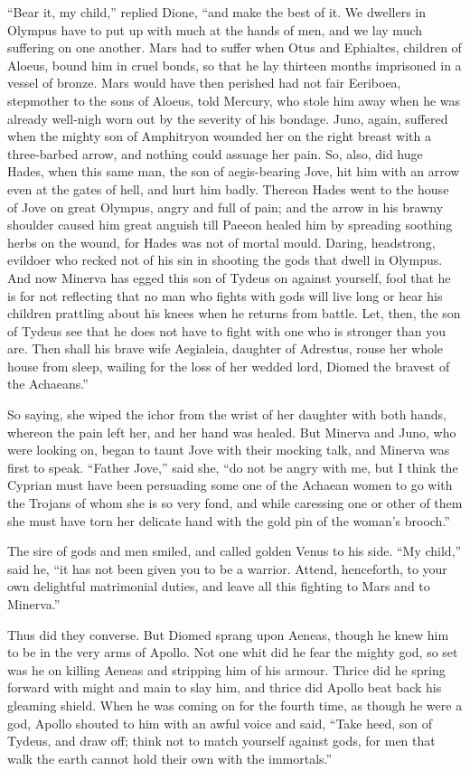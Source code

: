 “Bear it, my child,” replied Dione, “and make the best of it. We dwellers
in Olympus have to put up with much at the hands of men, and we lay much
suffering on one another. Mars had to suffer when Otus and Ephialtes,
children of Aloeus, bound him in cruel bonds, so that he lay thirteen
months imprisoned in a vessel of bronze. Mars would have then perished had
not fair Eeriboea, stepmother to the sons of Aloeus, told Mercury, who
stole him away when he was already well-nigh worn out by the severity of
his bondage. Juno, again, suffered when the mighty son of Amphitryon
wounded her on the right breast with a three-barbed arrow, and nothing
could assuage her pain. So, also, did huge Hades, when this same man, the
son of aegis-bearing Jove, hit him with an arrow even at the gates of
hell, and hurt him badly. Thereon Hades went to the house of Jove on great
Olympus, angry and full of pain; and the arrow in his brawny shoulder
caused him great anguish till Paeeon healed him by spreading soothing
herbs on the wound, for Hades was not of mortal mould. Daring,
headstrong, evildoer who recked not of his sin in shooting the gods that
dwell in Olympus. And now Minerva has egged this son of Tydeus on against
yourself, fool that he is for not reflecting that no man who fights with
gods will live long or hear his children prattling about his knees when he
returns from battle. Let, then, the son of Tydeus see that he does not
have to fight with one who is stronger than you are. Then shall his brave
wife Aegialeia, daughter of Adrestus, rouse her whole house from sleep,
wailing for the loss of her wedded lord, Diomed the bravest of the
Achaeans.”

So saying, she wiped the ichor from the wrist of her daughter with both
hands, whereon the pain left her, and her hand was healed. But Minerva and
Juno, who were looking on, began to taunt Jove with their mocking talk,
and Minerva was first to speak. “Father Jove,” said she, “do not be angry
with me, but I think the Cyprian must have been persuading some one of the
Achaean women to go with the Trojans of whom she is so very fond, and
while caressing one or other of them she must have torn her delicate hand
with the gold pin of the woman’s brooch.”

The sire of gods and men smiled, and called golden Venus to his side. “My
child,” said he, “it has not been given you to be a warrior. Attend,
henceforth, to your own delightful matrimonial duties, and leave all this
fighting to Mars and to Minerva.”

Thus did they converse. But Diomed sprang upon Aeneas, though he knew him
to be in the very arms of Apollo. Not one whit did he fear the mighty god,
so set was he on killing Aeneas and stripping him of his armour. Thrice
did he spring forward with might and main to slay him, and thrice did
Apollo beat back his gleaming shield. When he was coming on for the fourth
time, as though he were a god, Apollo shouted to him with an awful voice
and said, “Take heed, son of Tydeus, and draw off; think not to match
yourself against gods, for men that walk the earth cannot hold their own
with the immortals.”

